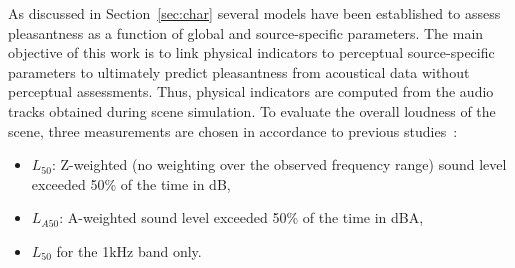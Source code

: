 \documentclass{article}
\begin{document}
\begin{sloppy}
As discussed in Section~\ref{sec:char} several models have been established to assess pleasantness as a function of global and source-specific parameters. The main objective of this work is to link physical indicators to perceptual source-specific parameters to ultimately predict pleasantness from acoustical data without perceptual assessments. Thus, physical indicators are computed from the audio tracks obtained during scene simulation. To evaluate the overall loudness of the scene, three measurements are chosen in accordance to previous studies~\cite{decoensel2006, ricciardi2014, aumond2017}:
\begin{itemize}
\item $L_{50}$: Z-weighted (no weighting over the observed frequency range) sound level exceeded 50\% of the time in dB,
\item $L_{A50}$: A-weighted sound level exceeded 50\% of the time in dBA,
\item $L_{50}$ for the 1kHz band only.
\end{itemize}



\end{sloppy}
\end{document}
